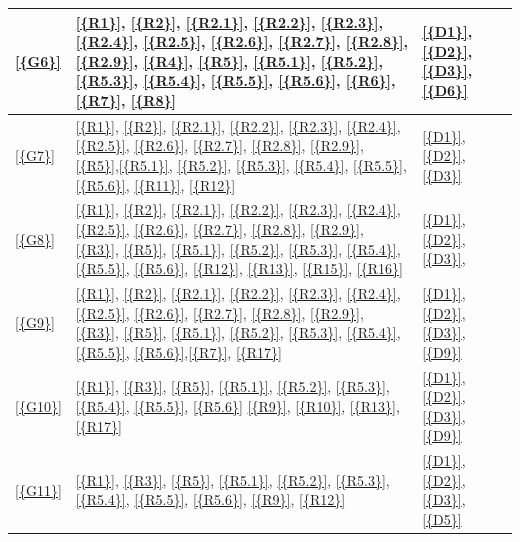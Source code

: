 \begin{table}[H]
\begin{tabular}{|l|p{8cm}|p{5cm}|}
            
            \ref{{G6}}
            &
            \ref{{R1}}, \ref{{R2}}, \ref{{R2.1}}, \ref{{R2.2}}, \ref{{R2.3}}, \ref{{R2.4}}, \ref{{R2.5}}, \ref{{R2.6}}, \ref{{R2.7}}, \ref{{R2.8}}, \ref{{R2.9}}, \ref{{R4}}, \ref{{R5}}, \ref{{R5.1}}, \ref{{R5.2}}, \ref{{R5.3}}, \ref{{R5.4}}, \ref{{R5.5}}, \ref{{R5.6}}, \ref{{R6}}, \ref{{R7}}, \ref{{R8}}
            &
            \ref{{D1}}, \ref{{D2}}, \ref{{D3}}, \ref{{D6}}                                \\\hline

            
            \ref{{G7}}
            & 
            \ref{{R1}}, \ref{{R2}}, \ref{{R2.1}}, \ref{{R2.2}}, \ref{{R2.3}}, \ref{{R2.4}}, \ref{{R2.5}}, \ref{{R2.6}}, \ref{{R2.7}}, \ref{{R2.8}}, \ref{{R2.9}}, \ref{{R5}},\ref{{R5.1}}, \ref{{R5.2}}, \ref{{R5.3}}, \ref{{R5.4}}, \ref{{R5.5}}, \ref{{R5.6}}, \ref{{R11}}, \ref{{R12}}
            & 
            \ref{{D1}}, \ref{{D2}}, \ref{{D3}}
            \\\hline

            
            \ref{{G8}}
            &
            \ref{{R1}}, \ref{{R2}}, \ref{{R2.1}}, \ref{{R2.2}}, \ref{{R2.3}}, \ref{{R2.4}}, \ref{{R2.5}}, \ref{{R2.6}}, \ref{{R2.7}}, \ref{{R2.8}}, \ref{{R2.9}}, \ref{{R3}}, \ref{{R5}}, \ref{{R5.1}}, \ref{{R5.2}}, \ref{{R5.3}}, \ref{{R5.4}}, \ref{{R5.5}}, \ref{{R5.6}}, \ref{{R12}}, \ref{{R13}}, \ref{{R15}}, \ref{{R16}}
            &
            \ref{{D1}}, \ref{{D2}}, \ref{{D3}}, 
            \\\hline

            
            \ref{{G9}}
            &
            \ref{{R1}}, \ref{{R2}}, \ref{{R2.1}}, \ref{{R2.2}}, \ref{{R2.3}}, \ref{{R2.4}}, \ref{{R2.5}}, \ref{{R2.6}}, \ref{{R2.7}}, \ref{{R2.8}}, \ref{{R2.9}}, \ref{{R3}}, \ref{{R5}}, \ref{{R5.1}}, \ref{{R5.2}}, \ref{{R5.3}}, \ref{{R5.4}}, \ref{{R5.5}}, \ref{{R5.6}},\ref{{R7}}, \ref{{R17}}
            &
            \ref{{D1}}, \ref{{D2}}, \ref{{D3}}, \ref{{D9}}                                \\\hline

            
            \ref{{G10}}
            &
            \ref{{R1}}, \ref{{R3}}, \ref{{R5}}, \ref{{R5.1}}, \ref{{R5.2}}, \ref{{R5.3}}, \ref{{R5.4}}, \ref{{R5.5}}, \ref{{R5.6}} \ref{{R9}}, \ref{{R10}}, \ref{{R13}}, \ref{{R17}}
            &
            \ref{{D1}}, \ref{{D2}}, \ref{{D3}}, \ref{{D9}}
            \\\hline

            
            \ref{{G11}}
            &
            \ref{{R1}}, \ref{{R3}}, \ref{{R5}}, \ref{{R5.1}}, \ref{{R5.2}}, \ref{{R5.3}}, \ref{{R5.4}}, \ref{{R5.5}}, \ref{{R5.6}},  \ref{{R9}}, \ref{{R12}}
            &
            \ref{{D1}}, \ref{{D2}}, \ref{{D3}}, \ref{{D5}}
            \\\hline
            

\end{tabular}
\end{table}
